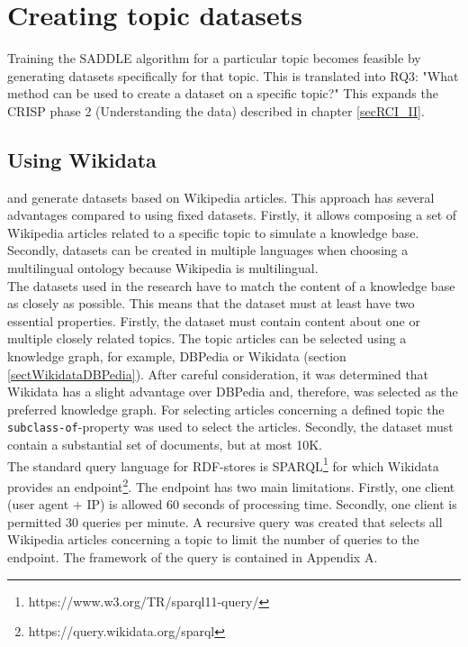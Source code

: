 \chapter{Creating topic datasets}
\label{chapTopicDatasets}

    Training the SADDLE algorithm for a particular topic becomes feasible by generating datasets specifically for that topic. This is translated into RQ3: "What method can be used to create a dataset on a specific topic?" This expands the CRISP phase 2 (Understanding the data) described in chapter \ref{secRCI_II}.


\section{Using Wikidata}
\label{sectWikidata}

\citep{jiang2019semantic} and \citep{512Tokens} generate datasets based on Wikipedia articles. This approach has several advantages compared to using fixed datasets. Firstly, it allows composing a set of Wikipedia articles related to a specific topic to simulate a knowledge base. Secondly, datasets can be created in multiple languages when choosing a multilingual ontology because Wikipedia is multilingual. \\

The datasets used in the research have to match the content of a knowledge base as closely as possible. This means that the dataset must at least have two essential properties. Firstly, the dataset must contain content about one or multiple closely related topics. The topic articles can be selected using a knowledge graph, for example, DBPedia or Wikidata (section \ref{sectWikidataDBPedia}). After careful consideration, it was determined that Wikidata has a slight advantage over DBPedia and, therefore, was selected as the preferred knowledge graph. For selecting articles concerning a defined topic the \texttt{subclass-of}-property was used to select the articles. Secondly, the dataset must contain a substantial set of documents, but at most 10K.  \\

The standard query language for RDF-stores is SPARQL\footnote{https://www.w3.org/TR/sparql11-query/} for which Wikidata provides an endpoint\footnote{https://query.wikidata.org/sparql}. The endpoint has two main limitations. Firstly, one client (user agent + IP) is allowed 60 seconds of processing time. Secondly, one client is permitted 30 queries per minute. A recursive query was created that selects all Wikipedia articles concerning a topic to limit the number of queries to the endpoint. The framework of the query is contained in Appendix A.\\

